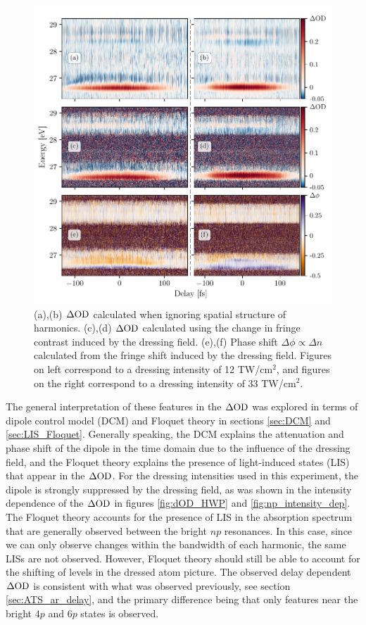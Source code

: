 \begin{figure}
	\centering
	\includegraphics[width=1.0\textwidth]{figures/CATS/delay_high_low.pdf}
	\caption[Delay-dependent $\dod$ and $\Delta \phi$ measured at high and moderate dressing intensities]{(a),(b) $\dod$ calculated when ignoring spatial structure of harmonics.  (c),(d)  $\dod$ calculated using the change in fringe contrast induced by the dressing field.  (e),(f) Phase shift $\Delta\phi\propto\Delta n $ calculated from the fringe shift induced by the dressing field.  Figures on left correspond to a dressing intensity of 12 TW/cm$^2$, and figures on the right correspond to a dressing intensity of 33 TW/cm$^2$.}
	\label{fig:delay_high_low}
\end{figure}

The general interpretation of these features in the $\dod$ was explored in terms of dipole control model (DCM) and Floquet theory in sections \ref{sec:DCM} and \ref{sec:LIS_Floquet}.  Generally speaking, the DCM explains the attenuation and phase shift of the dipole in the time domain due to the influence of the dressing field, and the Floquet theory explains the presence of light-induced states (LIS) that appear in the $\dod$.  For the dressing intensities used in this experiment, the dipole is strongly suppressed by the dressing field, as was shown in the intensity dependence of the $\dod$ in figures \ref{fig:dOD_HWP} and \ref{fig:np_intensity_dep}.  The Floquet theory accounts for the presence of LIS in the absorption spectrum that are generally observed between the bright $np$ resonances.  In this case, since we can only observe changes within the bandwidth of each harmonic, the same LISs are not observed.  However, Floquet theory should still be able to account for the shifting of levels in the dressed atom picture.  The observed delay dependent $\dod$ is consistent with what was observed previously, see section \ref{sec:ATS_ar_delay}, and the primary difference being that only features near the bright $4p$ and $6p$ states is observed.

